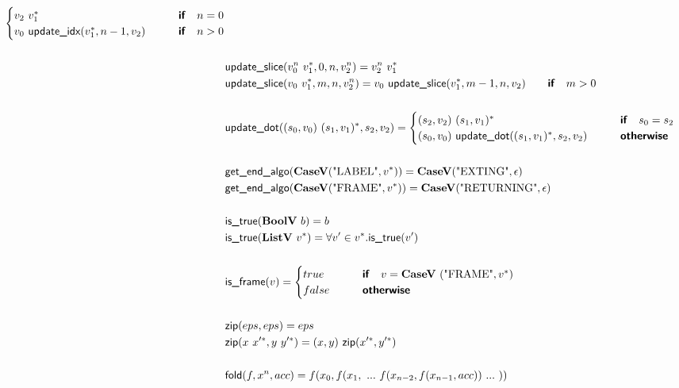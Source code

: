 \begin{align*}
  \begin{cases}
    v_2 ~ \seq{v_1}
    &\quad\quad\premise{if}\quad n = 0 \\
    v_0 ~ \updateidx(\seq{v_1}, n-1, v_2)
    &\quad\quad\premise{if}\quad n > 0 \\
  \end{cases} \\
%
\newline \\
  &\updateslice(v_0^n ~ \seq{v_1}, 0, n, v_2^n) = v_2^n ~ \seq{v_1} \\
  &\updateslice(v_0 ~ \seq{v_1}, m, n, v_2^n) =  v_0 ~ \updateslice(\seq{v_1}, m-1, n, v_2)
  \quad\quad\premise{if}\quad m > 0 \\
%
\newline \\
  &\updatedot((s_0, v_0) ~ \seq{(s_1, v_1)}, s_2, v_2) =
  \begin{cases}
    (s_2, v_2) ~ \seq{(s_1, v_1)}
    &\quad\quad\premise{if}\quad s_0 = s_2 \\
    (s_0, v_0) ~ \updatedot(\seq{(s_1, v_1)}, s_2, v_2)
    &\quad\quad\premise{otherwise}
  \end{cases}
  \\
%
\newline \\
  &\getendalgo(\casev(\text{"LABEL"}, \seq v)) = \casev(\text{"EXTING"}, \epsilon) \\
  &\getendalgo(\casev(\text{"FRAME"}, \seq v)) = \casev(\text{"RETURNING"}, \epsilon) \\
%
\newline \\
  &\istrue(\boolv ~ b) = b \\
  &\istrue(\listv ~ \seq v) = \forall v' \in \seq v. \istrue (v') \\
%
\newline \\
  &\isframe(v) =
  \begin{cases}
    true
    &\quad\quad\premise{if}\quad v = \casev ~ (\text{"FRAME"}, \seq v) \\
    false &\quad\quad\premise{otherwise}\\
  \end{cases}
  \\
%
\newline \\
  &\zip(eps, eps) = eps \\
  &\zip(x ~ \seq{x'}, y ~ \seq{y'}) = (x, y) ~ \zip (\seq{x'}, \seq{y'}) \\
%
\newline \\
  &\fold(f, x^n, acc) = f(x_0, f(x_1, ~ ... ~ f(x_{n-2}, f(x_{n-1}, acc)) ~ ... ~ ))
\end{align*}





